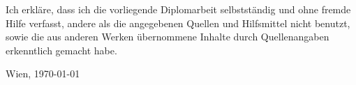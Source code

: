 Ich erkläre, dass ich die vorliegende Diplomarbeit selbstständig und ohne fremde Hilfe verfasst, andere als die angegebenen Quellen und Hilfsmittel nicht benutzt, sowie die aus anderen Werken übernommene Inhalte durch Quellenangaben erkenntlich gemacht habe.

Wien, \today

